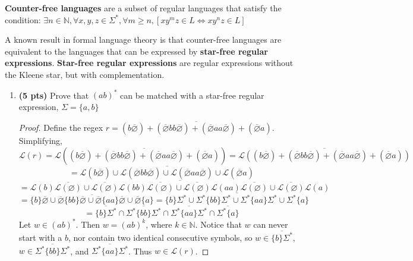 \documentclass[11pt]{article}
\begin{document}
\begin{enumerate}[label=\textbf{Q\arabic*.}]
\textbf{Counter-free languages} are a subset of regular languages that satisfy the condition:
$ \exists n \in \mathbb{N}, \forall x,y,z \in \Sigma^*, \forall m \geq n, [xy^mz \in L \iff xy^nz \in L]  $

A known result in formal language theory is that counter-free languages are equivalent to the languages that can be expressed by \textbf{star-free regular expressions}. \textbf{Star-free regular expressions} are  regular expressions without the Kleene star, but with complementation. 

\begin{enumerate}[label=\textit{\alph*)}]
	\item \textbf{(5 pts)} Prove that $(ab)^*$ can be matched with a star-free regular expression, $\Sigma = \{a,b\}$
	
	\begin{proof}
		Define the regex \(r = \overline{(b\overline{\varnothing}) + (\overline{\varnothing}bb\overline{\varnothing}) + (\overline{\varnothing}aa\overline{\varnothing}) + (\overline{\varnothing}a)}\). Simplifying,
		\[
			\mathcal{L} (r) = \mathcal{L} \left(\overline{(b\overline{\varnothing}) + (\overline{\varnothing}bb\overline{\varnothing}) + (\overline{\varnothing}aa\overline{\varnothing}) + (\overline{\varnothing}a)}\right) = \overline{\mathcal{L}((b\overline{\varnothing}) + (\overline{\varnothing}bb\overline{\varnothing}) + (\overline{\varnothing}aa\overline{\varnothing}) + (\overline{\varnothing}a))}
		\]
		\[
			= \overline{\mathcal{L} (b\overline{\varnothing}) \cup \mathcal{L} (\overline{\varnothing}bb\overline{\varnothing}) \cup \mathcal{L} (\overline{\varnothing}aa\overline{\varnothing}) \cup \mathcal{L} (\overline{\varnothing}a)}
		\]
		\[
			= \overline{\mathcal{L} (b) \overline{\mathcal{L} (\varnothing)} \cup \overline{\mathcal{L} (\varnothing)} \mathcal{L} (bb) \overline{\mathcal{L} (\varnothing)} \cup \overline{\mathcal{L} (\varnothing)} \mathcal{L} (aa) \overline{\mathcal{L} (\varnothing)} \cup \overline{\mathcal{L} (\varnothing)}\mathcal{L} (a)}
		\]
		\[
			= \overline{\{b\} \overline{\varnothing} \cup \overline{\varnothing} \{bb\} \overline{\varnothing} \cup \overline{\varnothing} \{aa\} \overline{\varnothing} \cup \overline{\varnothing}\{a\}} = \overline{\{b\} \Sigma ^* \cup \Sigma ^* \{bb\} \Sigma ^* \cup \Sigma ^* \{aa\} \Sigma ^* \cup \Sigma ^* \{a\}}
		\]
		\[
			= \overline{\{b\}\Sigma ^*} \cap \overline{\Sigma ^* \{bb\}\Sigma ^*} \cap \overline{\Sigma ^* \{aa\} \Sigma ^*} \cap \overline{\Sigma ^* \{a\}}
		\]
		Let \(w \in (ab)^*\). Then \(w = (ab)^k\), where \(k \in \mathbb{N}\). Notice that \(w\) can never start with a \(b\), nor contain two identical consecutive symbols, so \(w \in \overline{\{b\}\Sigma ^*}\), \(w \in \overline{\Sigma ^* \{bb\}\Sigma ^*}\), and \(\overline{\Sigma ^* \{aa\} \Sigma ^*}\). Thus \(w \in \mathcal{L} (r)\).


\end{proof}
\end{enumerate}
\end{enumerate}
\end{document}
